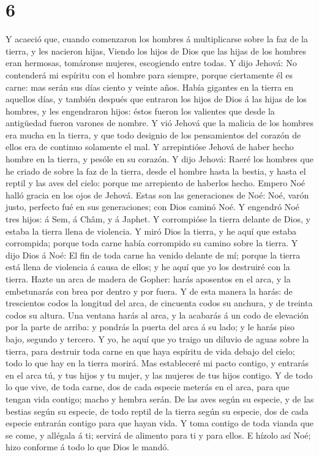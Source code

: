 \hypertarget{section-5}{%
\section{6}\label{section-5}}

 Y acaeció que, cuando comenzaron los hombres á
multiplicarse sobre la faz de la tierra, y les nacieron hijas,
 Viendo los hijos de Dios que las hijas de los hombres eran
hermosas, tomáronse mujeres, escogiendo entre todas.  Y dijo
Jehová: No contenderá mi espíritu con el hombre para siempre, porque
ciertamente él es carne: mas serán sus días ciento y veinte años.
 Había gigantes en la tierra en aquellos días, y también
después que entraron los hijos de Dios á las hijas de los hombres, y les
engendraron hijos: éstos fueron los valientes que desde la antigüedad
fueron varones de nombre.  Y vió Jehová que la malicia de
los hombres era mucha en la tierra, y que todo designio de los
pensamientos del corazón de ellos era de continuo solamente el mal.
 Y arrepintióse Jehová de haber hecho hombre en la tierra, y
pesóle en su corazón.  Y dijo Jehová: Raeré los hombres que
he criado de sobre la faz de la tierra, desde el hombre hasta la bestia,
y hasta el reptil y las aves del cielo: porque me arrepiento de haberlos
hecho.  Empero Noé halló gracia en los ojos de Jehová.
 Estas son las generaciones de Noé: Noé, varón justo,
perfecto fué en sus generaciones; con Dios caminó Noé.  Y
engendró Noé tres hijos: á Sem, á Châm, y á Japhet.  Y
corrompióse la tierra delante de Dios, y estaba la tierra llena de
violencia.  Y miró Dios la tierra, y he aquí que estaba
corrompida; porque toda carne había corrompido su camino sobre la
tierra.  Y dijo Dios á Noé: El fin de toda carne ha venido
delante de mí; porque la tierra está llena de violencia á causa de
ellos; y he aquí que yo los destruiré con la tierra.  Hazte
un arca de madera de Gopher: harás aposentos en el arca, y la
embetunarás con brea por dentro y por fuera.  Y de esta
manera la harás: de trescientos codos la longitud del arca, de cincuenta
codos su anchura, y de treinta codos su altura.  Una
ventana harás al arca, y la acabarás á un codo de elevación por la parte
de arriba: y pondrás la puerta del arca á su lado; y le harás piso bajo,
segundo y tercero.  Y yo, he aquí que yo traigo un diluvio
de aguas sobre la tierra, para destruir toda carne en que haya espíritu
de vida debajo del cielo; todo lo que hay en la tierra morirá.
 Mas estableceré mi pacto contigo, y entrarás en el arca
tú, y tus hijos y tu mujer, y las mujeres de tus hijos contigo.
 Y de todo lo que vive, de toda carne, dos de cada especie
meterás en el arca, para que tengan vida contigo; macho y hembra serán.
 De las aves según su especie, y de las bestias según su
especie, de todo reptil de la tierra según su especie, dos de cada
especie entrarán contigo para que hayan vida.  Y toma
contigo de toda vianda que se come, y allégala á ti; servirá de alimento
para ti y para ellos.  E hízolo así Noé; hizo conforme á
todo lo que Dios le mandó.

